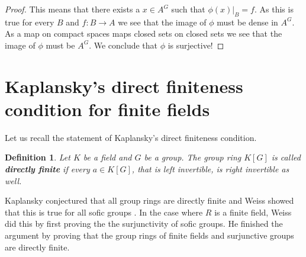 \documentclass[titlepage, a4paper]{article}
\newtheorem{definition}{Definition}
\theoremstyle{remark}
\begin{document}
\begin{proof}
\bigskip

This means that there exists a $x \in A^{G}$ such that $\phi(x)|_B = f$. As this is true for every  $B$ and $f:B\to A$ we see that the image of  $\phi$ must be dense in $A^{G}$. As a map on compact spaces maps closed sets on closed sets we see that the image of $\phi$ must be $A^{G}$. 
We conclude that $\phi$ is surjective!

\end{proof}

	\section{Kaplansky's direct finiteness condition for finite fields}
	Let us recall the statement of Kaplansky's direct finiteness condition.
	\begin{definition}
		Let $K$ be a field and $G$ be a group. The group ring $K[G]$ is called \textbf{directly finite} if every  $a \in K[G]$, that is left invertible, is right invertible as well. 
		
	\end{definition}
	Kaplansky conjectured that all group rings are directly finite and Weiss showed that this is true for all sofic groups \cite{weiss_2000}. 
	In the case where $R$ is a finite field, Weiss did this by first proving the the surjunctivity of sofic groups.
	He finished the argument by proving that the group rings of finite fields and surjunctive groups are directly finite.  
\end{document}
